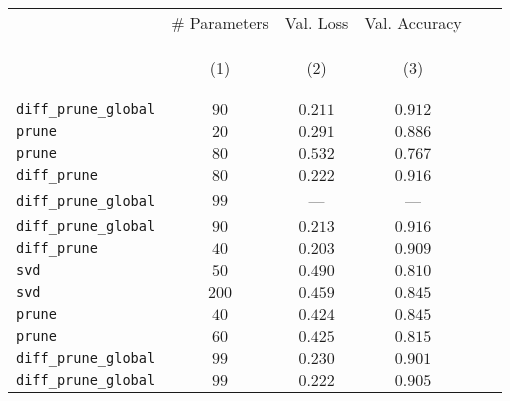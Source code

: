 \begin{table}[tbh]
        \caption{}
        \label{tab:}
        \centering
        \vspace{1em}
        \begin{tabular}{lccccc}
\toprule
{} &               \# Parameters &                   Val. Loss &               Val. Accuracy \\
{} & \hypertarget{tabcol:1}{(1)} & \hypertarget{tabcol:2}{(2)} & \hypertarget{tabcol:3}{(3)} \\
\midrule
\texttt{diff\_prune\_global} &      $90$\textsuperscript{} &   $0.211$\textsuperscript{} &   $0.912$\textsuperscript{} \\
\texttt{prune}               &      $20$\textsuperscript{} &   $0.291$\textsuperscript{} &   $0.886$\textsuperscript{} \\
\texttt{prune}               &      $80$\textsuperscript{} &   $0.532$\textsuperscript{} &   $0.767$\textsuperscript{} \\
\texttt{diff\_prune}         &      $80$\textsuperscript{} &   $0.222$\textsuperscript{} &   $0.916$\textsuperscript{} \\
\texttt{diff\_prune\_global} &      $99$\textsuperscript{} &                         --- &                         --- \\
\texttt{diff\_prune\_global} &      $90$\textsuperscript{} &   $0.213$\textsuperscript{} &   $0.916$\textsuperscript{} \\
\texttt{diff\_prune}         &      $40$\textsuperscript{} &   $0.203$\textsuperscript{} &   $0.909$\textsuperscript{} \\
\texttt{svd}                 &      $50$\textsuperscript{} &   $0.490$\textsuperscript{} &   $0.810$\textsuperscript{} \\
\texttt{svd}                 &     $200$\textsuperscript{} &   $0.459$\textsuperscript{} &   $0.845$\textsuperscript{} \\
\texttt{prune}               &      $40$\textsuperscript{} &   $0.424$\textsuperscript{} &   $0.845$\textsuperscript{} \\
\texttt{prune}               &      $60$\textsuperscript{} &   $0.425$\textsuperscript{} &   $0.815$\textsuperscript{} \\
\texttt{diff\_prune\_global} &      $99$\textsuperscript{} &   $0.230$\textsuperscript{} &   $0.901$\textsuperscript{} \\
\texttt{diff\_prune\_global} &      $99$\textsuperscript{} &   $0.222$\textsuperscript{} &   $0.905$\textsuperscript{} \\

\end{tabular}
\end{table}
